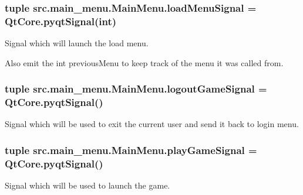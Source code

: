 \subsubsection[{load\+Menu\+Signal}]{\setlength{\rightskip}{0pt plus 5cm}tuple src.\+main\+\_\+menu.\+Main\+Menu.\+load\+Menu\+Signal = Qt\+Core.\+pyqt\+Signal(int)\hspace{0.3cm}{\ttfamily [static]}}\label{classsrc_1_1main__menu_1_1_main_menu_a51466fb736e3368249412c501aa18741}


Signal which will launch the load menu. 

Also emit the int \textquotesingle{}previous\+Menu\textquotesingle{} to keep track of the menu it was called from. \hypertarget{classsrc_1_1main__menu_1_1_main_menu_ac8a9bae484f207fa58edd090112c8be3}{}
\subsubsection[{logout\+Game\+Signal}]{\setlength{\rightskip}{0pt plus 5cm}tuple src.\+main\+\_\+menu.\+Main\+Menu.\+logout\+Game\+Signal = Qt\+Core.\+pyqt\+Signal()\hspace{0.3cm}{\ttfamily [static]}}\label{classsrc_1_1main__menu_1_1_main_menu_ac8a9bae484f207fa58edd090112c8be3}


Signal which will be used to exit the current user and send it back to login menu. 

\hypertarget{classsrc_1_1main__menu_1_1_main_menu_a5649447e46d6bd6bdc5f1289941c8c02}{}
\subsubsection[{play\+Game\+Signal}]{\setlength{\rightskip}{0pt plus 5cm}tuple src.\+main\+\_\+menu.\+Main\+Menu.\+play\+Game\+Signal = Qt\+Core.\+pyqt\+Signal()\hspace{0.3cm}{\ttfamily [static]}}\label{classsrc_1_1main__menu_1_1_main_menu_a5649447e46d6bd6bdc5f1289941c8c02}


Signal which will be used to launch the game. 


